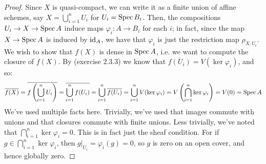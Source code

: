 \begin{proof}
	Since $X$ is quasi-compact, we can write it as a finite union of affine schemes, say $X = \bigcup_{i=1}^n U_i$ for $U_i = \operatorname{Spec} B_i$. Then, the compositions $U_i \to X \to \operatorname{Spec} A$ induce maps $\varphi_i : A \to B_i$ for each $i$; in fact, since the map $X \to \operatorname{Spec} A$ is induced by $\operatorname{id}_A$, we have that $\varphi_i$ is just the restriction map $\rho_{X,U_i}$. We wish to show that $f(X)$ is dense in $\operatorname{Spec} A$, i.e. we want to compute the closure of $f(X)$. By (exercise 2.3.3) we know that $\overline{f(U_i)} = V(\ker \varphi_i)$, and so:
\[ \overline{f(X)} = \overline{f\left(\bigcup_{i=1}^n U_i\right)} = \overline{\bigcup_{i=1}^n f(U_i)} = \bigcup_{i=1}^n \overline{f(U_i)} = \bigcup_{i=1}^n V(\ker\varphi_i) = V\left(\bigcap_{i=1}^n \ker\varphi_i\right) = V(0) = \operatorname{Spec} A \]
We've used multiple facts here. Trivially, we've used that images commute with unions and that closures commute with finite unions. Less trivially, we've noted that $\bigcap_{i=1}^n \ker\varphi_i = 0$. This is in fact just the sheaf condition. For if $g \in \bigcap_{i=1}^n \ker\varphi_i$, then $g|_{U_i} = \varphi_i(g) = 0$, so $g$ is zero on an open cover, and hence globally zero.
\end{proof}
